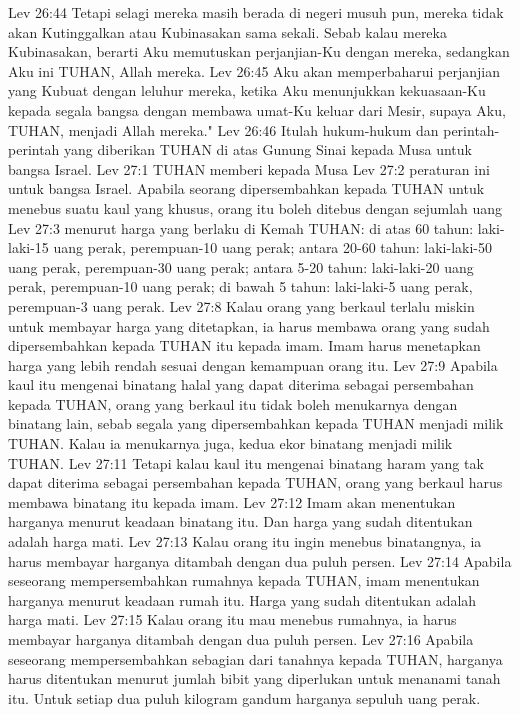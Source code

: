 Lev 26:44  Tetapi selagi mereka masih berada di negeri musuh pun, mereka tidak akan Kutinggalkan atau Kubinasakan sama sekali. Sebab kalau mereka Kubinasakan, berarti Aku memutuskan perjanjian-Ku dengan mereka, sedangkan Aku ini TUHAN, Allah mereka.
Lev 26:45  Aku akan memperbaharui perjanjian yang Kubuat dengan leluhur mereka, ketika Aku menunjukkan kekuasaan-Ku kepada segala bangsa dengan membawa umat-Ku keluar dari Mesir, supaya Aku, TUHAN, menjadi Allah mereka."
Lev 26:46  Itulah hukum-hukum dan perintah-perintah yang diberikan TUHAN di atas Gunung Sinai kepada Musa untuk bangsa Israel.
Lev 27:1  TUHAN memberi kepada Musa
Lev 27:2  peraturan ini untuk bangsa Israel. Apabila seorang dipersembahkan kepada TUHAN untuk menebus suatu kaul yang khusus, orang itu boleh ditebus dengan sejumlah uang
Lev 27:3  menurut harga yang berlaku di Kemah TUHAN: di atas 60 tahun: laki-laki-15 uang perak, perempuan-10 uang perak; antara 20-60 tahun: laki-laki-50 uang perak, perempuan-30 uang perak; antara 5-20 tahun: laki-laki-20 uang perak, perempuan-10 uang perak; di bawah 5 tahun: laki-laki-5 uang perak, perempuan-3 uang perak.
Lev 27:8  Kalau orang yang berkaul terlalu miskin untuk membayar harga yang ditetapkan, ia harus membawa orang yang sudah dipersembahkan kepada TUHAN itu kepada imam. Imam harus menetapkan harga yang lebih rendah sesuai dengan kemampuan orang itu.
Lev 27:9  Apabila kaul itu mengenai binatang halal yang dapat diterima sebagai persembahan kepada TUHAN, orang yang berkaul itu tidak boleh menukarnya dengan binatang lain, sebab segala yang dipersembahkan kepada TUHAN menjadi milik TUHAN. Kalau ia menukarnya juga, kedua ekor binatang menjadi milik TUHAN.
Lev 27:11  Tetapi kalau kaul itu mengenai binatang haram yang tak dapat diterima sebagai persembahan kepada TUHAN, orang yang berkaul harus membawa binatang itu kepada imam.
Lev 27:12  Imam akan menentukan harganya menurut keadaan binatang itu. Dan harga yang sudah ditentukan adalah harga mati.
Lev 27:13  Kalau orang itu ingin menebus binatangnya, ia harus membayar harganya ditambah dengan dua puluh persen.
Lev 27:14  Apabila seseorang mempersembahkan rumahnya kepada TUHAN, imam menentukan harganya menurut keadaan rumah itu. Harga yang sudah ditentukan adalah harga mati.
Lev 27:15  Kalau orang itu mau menebus rumahnya, ia harus membayar harganya ditambah dengan dua puluh persen.
Lev 27:16  Apabila seseorang mempersembahkan sebagian dari tanahnya kepada TUHAN, harganya harus ditentukan menurut jumlah bibit yang diperlukan untuk menanami tanah itu. Untuk setiap dua puluh kilogram gandum harganya sepuluh uang perak.
